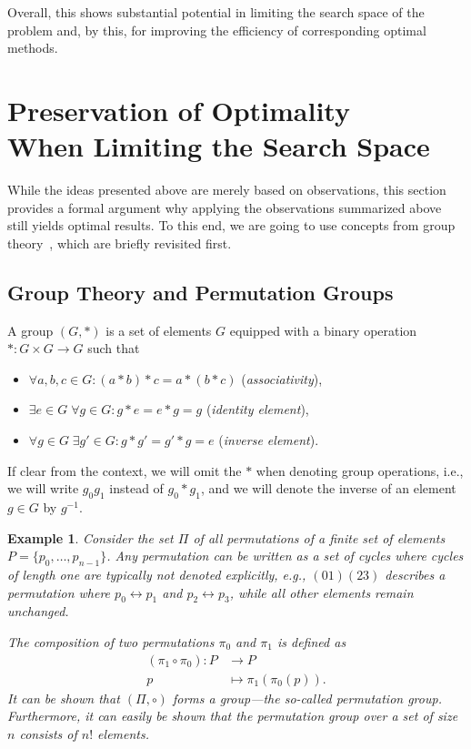 \documentclass[10pt,conference]{IEEEtran}
\newtheorem{example}{Example}
\begin{document}
Overall, this shows substantial potential in limiting the search space of the problem and, by this, for improving the efficiency of corresponding optimal methods.  

\section{Preservation of Optimality\\When Limiting the Search Space}\label{sec:formal}

While the ideas presented above are merely based on observations, this section provides a formal argument why applying the observations summarized above still yields optimal results. To this end, we are going to use concepts from group theory~\cite{carterVisualGroupTheory2009}, which are briefly revisited first. 

\subsection{Group Theory and Permutation Groups}\label{sec:grouptheory}

A group $(G, *)$ is a set of elements $G$ equipped with a binary operation $*: G\times G \to G$ such that 
\begin{itemize}
	\item $\forall a, b, c\in G\colon (a * b) * c = a * (b * c)$ (\emph{associativity}),
	\item $\exists e \in G\;\forall g\in G\colon g * e = e * g = g$ (\emph{identity element}),
	\item $\forall g\in G \; \exists g'\in G\colon g * g' = g' * g = e$ (\emph{inverse element}).
\end{itemize}
If clear from the context, we will omit the $*$ when denoting group operations, i.e., we will write $g_0g_1$ instead of $g_0 * g_1$, and we will denote the inverse of an element $g\in G$ by $g^{-1}$.


\begin{example}
Consider the set $\Pi$ of all \emph{permutations} of a finite set of elements $P = \{p_0, \dots, p_{n-1}\}$.
Any permutation can be written as a set of cycles where cycles of length one are typically not denoted explicitly, e.g., $(01)(23)$ describes a permutation where $p_0 \leftrightarrow p_1$ and $p_2 \leftrightarrow p_3$, while all other elements remain unchanged.
 
\noindent The composition of two permutations $\pi_0$ and $\pi_1$ is defined as 
\begin{align*}
(\pi_1\circ\pi_0)\colon P &\to P \\
p &\mapsto \pi_1(\pi_0(p)).
\end{align*}
It can be shown that $(\Pi, \circ)$ forms a group---the so-called \emph{permutation group}.
Furthermore, it can easily be shown that the permutation group over a set of size $n$ consists of $n!$ elements.
\end{example}
\end{document}
